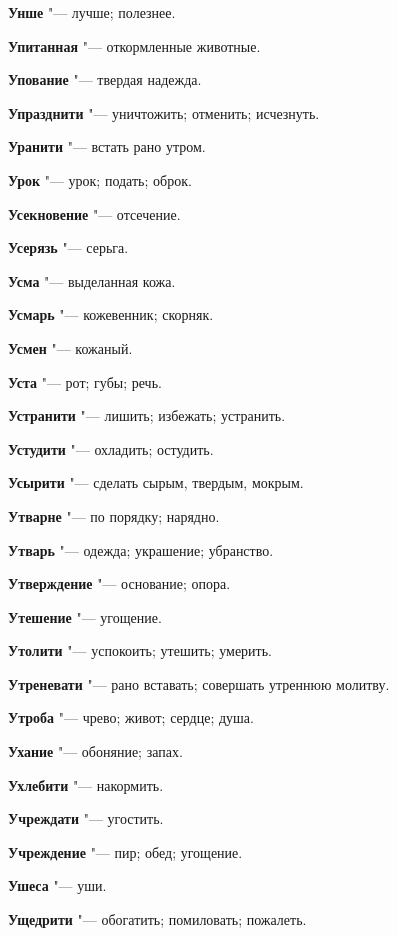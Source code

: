 \begin{mymulticols}
\noindent\textbf{Унше} "--- лучше; полезнее. 

\noindent\textbf{Упитанная} "--- откормленные животные. 

\noindent\textbf{Упование} "--- твердая надежда. 

\noindent\textbf{Упразднити} "--- уничтожить; отменить; исчезнуть. 

\noindent\textbf{Уранити} "--- встать рано утром. 

\noindent\textbf{Урок} "--- урок; подать; оброк. 

\noindent\textbf{Усекновение} "--- отсечение. 

\noindent\textbf{Усерязь} "--- серьга. 

\noindent\textbf{Усма} "--- выделанная кожа. 

\noindent\textbf{Усмарь} "--- кожевенник; скорняк. 

\noindent\textbf{Усмен} "--- кожаный. 

\noindent\textbf{Уста} "--- рот; губы; речь. 

\noindent\textbf{Устранити} "--- лишить; избежать; устранить. 

\noindent\textbf{Устудити} "--- охладить; остудить. 

\noindent\textbf{Усырити} "--- сделать сырым, твердым, мокрым. 

\noindent\textbf{Утварне} "--- по порядку; нарядно. 

\noindent\textbf{Утварь} "--- одежда; украшение; убранство. 

\noindent\textbf{Утверждение} "--- основание; опора. 

\noindent\textbf{Утешение} "--- угощение. 

\noindent\textbf{Утолити} "--- успокоить; утешить; умерить. 

\noindent\textbf{Утреневати} "--- рано вставать; совершать утреннюю молитву. 

\noindent\textbf{Утроба} "--- чрево; живот; сердце; душа. 

\noindent\textbf{Ухание} "--- обоняние; запах. 

\noindent\textbf{Ухлебити} "--- накормить. 

\noindent\textbf{Учреждати} "--- угостить. 

\noindent\textbf{Учреждение} "--- пир; обед; угощение. 

\noindent\textbf{Ушеса} "--- уши. 

\noindent\textbf{Ущедрити} "--- обогатить; помиловать; пожалеть. 


\end{mymulticols}
